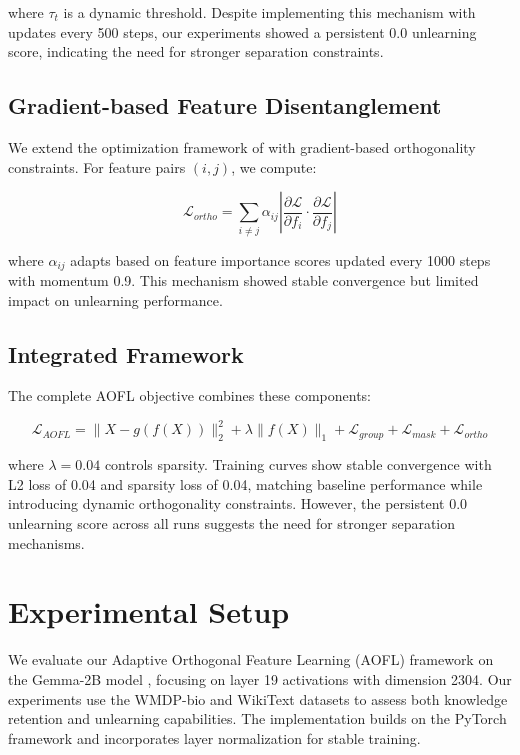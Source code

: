 \documentclass{article} %
\begin{document}
where $\tau_t$ is a dynamic threshold. Despite implementing this mechanism with updates every 500 steps, our experiments showed a persistent 0.0 unlearning score, indicating the need for stronger separation constraints.

\subsection{Gradient-based Feature Disentanglement}
We extend the optimization framework of \cite{kingma2014adam} with gradient-based orthogonality constraints. For feature pairs $(i,j)$, we compute:

\begin{equation}
    \mathcal{L}_{ortho} = \sum_{i \neq j} \alpha_{ij} \left|\frac{\partial \mathcal{L}}{\partial f_i} \cdot \frac{\partial \mathcal{L}}{\partial f_j}\right|
\end{equation}

where $\alpha_{ij}$ adapts based on feature importance scores updated every 1000 steps with momentum 0.9. This mechanism showed stable convergence but limited impact on unlearning performance.

\subsection{Integrated Framework}
The complete AOFL objective combines these components:

\begin{equation}
    \mathcal{L}_{AOFL} = \|X - g(f(X))\|_2^2 + \lambda \|f(X)\|_1 + \mathcal{L}_{group} + \mathcal{L}_{mask} + \mathcal{L}_{ortho}
\end{equation}

where $\lambda=0.04$ controls sparsity. Training curves show stable convergence with L2 loss of 0.04 and sparsity loss of 0.04, matching baseline performance while introducing dynamic orthogonality constraints. However, the persistent 0.0 unlearning score across all runs suggests the need for stronger separation mechanisms.

\section{Experimental Setup}
\label{sec:experimental}

We evaluate our Adaptive Orthogonal Feature Learning (AOFL) framework on the Gemma-2B model \cite{vaswani2017attention}, focusing on layer 19 activations with dimension 2304. Our experiments use the WMDP-bio and WikiText datasets to assess both knowledge retention and unlearning capabilities. The implementation builds on the PyTorch framework \cite{paszke2019pytorch} and incorporates layer normalization \cite{ba2016layer} for stable training.
\end{document}

